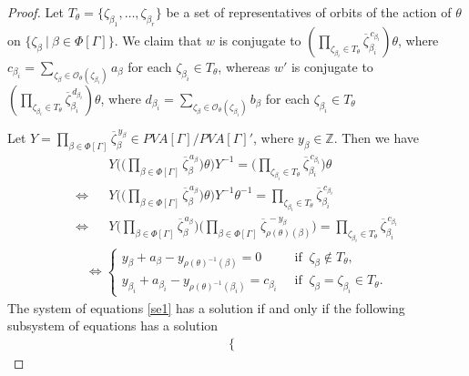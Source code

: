 \documentclass[12pt]{amsart}
\numberwithin{equation}{section}
\begin{document}
\begin{proof}
Let $T_\theta=\{\zeta_{\beta_1}, \ldots, \zeta_{\beta_r}\}$ be a set of representatives of orbits of the action of $\theta$ on $\{\zeta_\beta ~|~ \beta \in \Phi[\Gamma]\}$. We claim that $w$ is conjugate to  $(\prod_{\zeta_{\beta_i}\in T_{\theta}} \overline{\zeta}_{\beta_i}^{\,c_{\beta_i}})\theta$, where $c_{\beta_i}=\sum_{\zeta_\beta\in\mathcal{O}_{\theta}(\zeta_{\beta_i})}{a_\beta}$ for each $\zeta_{\beta_i}\in T_{\theta}$, whereas $w'$ is conjugate to $(\prod_{\zeta_{\beta_i}\in T_{\theta}} \overline{\zeta}_{\beta_i}^{\,d_{\beta_i}})\theta$, where $d_{\beta_i}=\sum_{\zeta_\beta\in\mathcal{O}_{\theta}(\zeta_{\beta_i})}{b_\beta}$ for each $\zeta_{\beta_i}\in T_{\theta}$
\par

Let $Y=\prod_{\beta \in \Phi[\Gamma]}\overline{\zeta}_{\beta}^{\, y_\beta}\in PVA[\Gamma]/PVA[\Gamma]'$, where $y_\beta\in\mathbb Z$. Then we have
\begin{eqnarray*}
& &Y \Bigg(\big(\prod_{\beta \in \Phi[\Gamma]}\overline{\zeta}_{\beta}^{\,a_\beta} \big)\theta \Bigg)Y^{-1}=\big(\prod_{\zeta_{\beta_i}\in T_{\theta}} \overline{\zeta}_{\beta_i}^{\,c_{\beta_i}} \big)\theta\\
\Leftrightarrow & & Y \Bigg( \big(\prod_{\beta \in \Phi[\Gamma]} \overline{\zeta}_{\beta}^{\,a_\beta} \big)\theta  \Bigg)Y^{-1} \theta^{-1}=\prod_{\zeta_{\beta_i}\in T_{\theta}} \overline{\zeta}_{\beta_i}^{\,c_{\beta_i}}\\
\Leftrightarrow & & Y \Bigg(\prod_{\beta \in \Phi[\Gamma]} \overline{\zeta}_{\beta}^{\,a_\beta}\Bigg)  \Bigg(\prod_{\beta \in \Phi[\Gamma]}\overline{\zeta}_{{\rho(\theta)(\beta)}}^{\,-y_\beta} \Bigg)=\prod_{\zeta_{\beta_i}\in T_{\theta}}\overline{\zeta}_{\beta_i}^{\,c_{\beta_i}}
\end{eqnarray*}
\begin{align}\label{se1}
\Leftrightarrow\begin{cases}
	y_{\beta}+a_{\beta}- y_{\rho(\theta)^{-1}(\beta)}=0 &~\mbox{ if }~\zeta_\beta\notin T_{\theta},\\
	y_{\beta_i}+a_{\beta_i}-y_{\rho(\theta)^{-1}(\beta_i)}=c_{\beta_i} &~\mbox{ if }~\zeta_\beta=\zeta_{\beta_i}\in T_{\theta}.
\end{cases}
\end{align}
The system of equations \eqref{se1} has a solution if and only if the following subsystem of equations has a solution   
	\begin{align}\label{se2}
\begin{cases}

\end{cases}
\end{align}
\end{proof}
\end{document}
